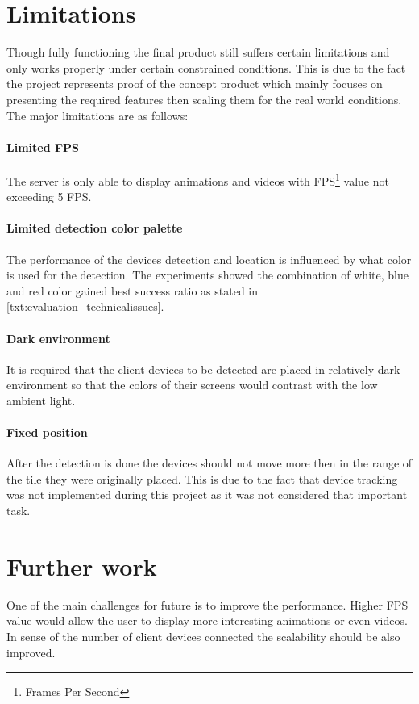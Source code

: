\section{Limitations}
Though fully functioning the final product still suffers certain limitations and only works properly under certain constrained conditions. This is due to the fact the project represents proof of the concept product which mainly focuses on presenting the required features then scaling them for the real world conditions. The major limitations are as follows:

\paragraph{Limited FPS} The server is only able to display animations and videos with FPS\footnote{Frames Per Second} value not exceeding 5 FPS.

\paragraph{Limited detection color palette} The performance of the devices detection and location is influenced by what color is used for the detection. The experiments showed the combination of white, blue and red color gained best success ratio as stated in \ref{txt:evaluation_technicalissues}.

\paragraph{Dark environment} It is required that the client devices to be detected are placed in relatively dark environment so that the colors of their screens would contrast with the low ambient light.

\paragraph{Fixed position} After the detection is done the devices should not move more then in the range of the tile they were originally placed. This is due to the fact that device tracking was not implemented during this project as it was not considered that important task.

\section{Further work}
One of the main challenges for future is to improve the performance.
Higher FPS value would allow the user to display more interesting animations or even videos. In sense of the number of client devices connected the scalability should be also improved.

